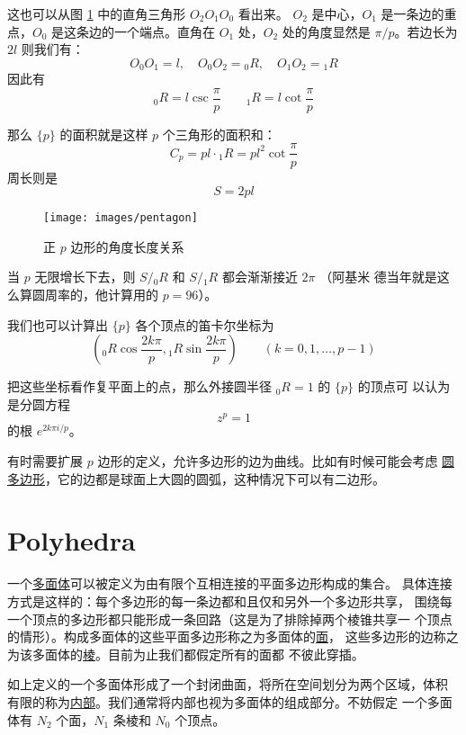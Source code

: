 \documentclass[cs4size,a4paper,adobefonts,openany]{ctexbook}
\newcommand{\pname}[1]{\underline{#1}}
\numberwithin{equation}{section}
\begin{document}
这也可以从图 \ref{fig:pentagon} 中的直角三角形 $O_2O_1O_0$ 看出来。
$O_2$ 是中心，$O_1$ 是一条边的重点，$O_0$ 是这条边的一个端点。直角在
$O_1$ 处，$O_2$ 处的角度显然是 $\pi/p$。若边长为 $2l$ 则我们有：
\[
O_0O_1=l,\quad O_0O_2={_0R}, \quad O_1O_2={_1R}
\]
因此有
\begin{equation}
  {_0R}=l\csc\frac{\pi}{p}\qquad {_1R}=l\cot\frac{\pi}{p}
\end{equation}

那么 $\{p\}$ 的面积就是这样 $p$ 个三角形的面积和：
\begin{equation}
  C_p = pl\cdot {_1R} = pl^2\cot\frac{\pi}{p}
\end{equation}
周长则是
\begin{equation}
  S=2pl
\end{equation}

\begin{figure}[htbp]
  \centering \texttt{[image: images/pentagon]}
  \caption{正 $p$ 边形的角度长度关系} \label{fig:pentagon}
\end{figure}

当 $p$ 无限增长下去，则 $S/{_0R}$ 和 $S/{_1R}$ 都会渐渐接近 $2\pi$ （阿基米
  德当年就是这么算圆周率的，他计算用的 $p=96$）。

我们也可以计算出 $\{p\}$ 各个顶点的笛卡尔坐标为
\[
\left({_0R}\cos\frac{2k\pi}{p},{_1R}\sin\frac{2k\pi}{p}\right)\qquad(k=0,1,\dots,p-1)
\]

把这些坐标看作复平面上的点，那么外接圆半径 ${_0R}=1$ 的 $\{p\}$ 的顶点可
以认为是分圆方程
\begin{equation}
  z^p=1
\end{equation}
的根 $e^{2k\pi i/p}$。

有时需要扩展 $p$ 边形的定义，允许多边形的边为曲线。比如有时候可能会考虑
\pname{圆多边形}，它的边都是球面上大圆的圆弧，这种情况下可以有二边形。

\section{Polyhedra}
一个\pname{多面体}可以被定义为由有限个互相连接的平面多边形构成的集合。
具体连接方式是这样的：每个多边形的每一条边都和且仅和另外一个多边形共享，
围绕每一个顶点的多边形都只能形成一条回路（这是为了排除掉两个棱锥共享一
  个顶点的情形）。构成多面体的这些平面多边形称之为多面体的\pname{面}，
这些多边形的边称之为该多面体的\pname{棱}。目前为止我们都假定所有的面都
不彼此穿插。

如上定义的一个多面体形成了一个封闭曲面，将所在空间划分为两个区域，体积
有限的称为\pname{内部}。我们通常将内部也视为多面体的组成部分。不妨假定
一个多面体有 $N_2$ 个面，$N_1$ 条棱和 $N_0$ 个顶点。
\end{document}
